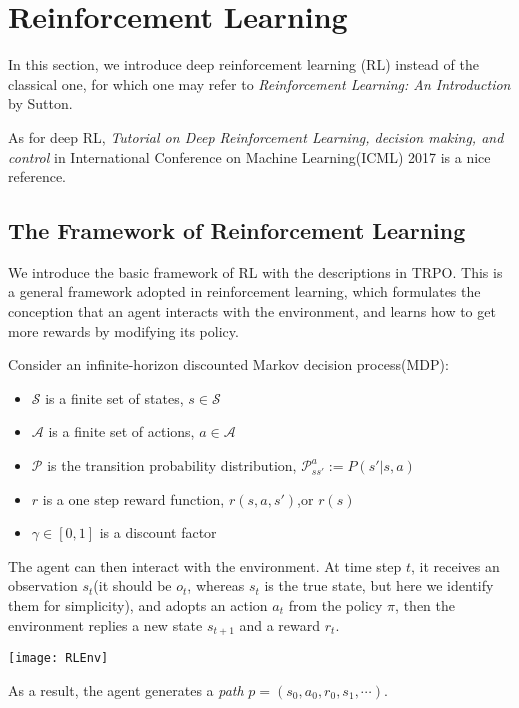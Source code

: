 \chapter{Reinforcement Learning}

In this section, we introduce deep reinforcement learning (RL) instead of the classical one, for which one may refer to \emph{Reinforcement Learning: An Introduction} by Sutton.

As for deep RL, \emph{Tutorial on Deep Reinforcement Learning, decision making, and control} in International Conference on Machine Learning(ICML) 2017 is a nice reference.

\section{The Framework of Reinforcement Learning}

We introduce the basic framework of RL with the descriptions in TRPO. This is a general framework adopted in reinforcement learning, which formulates the conception that an agent interacts with the environment, and learns how to get more rewards by modifying its policy.

Consider an infinite-horizon discounted Markov decision process(MDP): 
\begin{itemize}
    \item  $\mathcal{S}$ is a finite set of states, $s\in\mathcal{S}$
    \item $ \mathcal{A}$ is a finite set of actions, $a\in\mathcal{A}$
    \item $\mathcal{P}$ is the transition probability distribution, $\mathcal{P}_{ss'}^{a}:=P(s'|s,a)$
    \item $r$ is a one step reward function, $r(s,a,s')$,or $r(s)$ 
    \item $\gamma\in[0,1]$ is a discount factor
\end{itemize}

The agent can then interact with the environment. At time step $t$, it receives an observation $s_t$(it should be $o_t$, whereas $s_t$ is the true state, but here we identify them for simplicity), and adopts an action $a_t$ from the policy $\pi$, then the environment replies a new state $s_{t+1}$ and a reward $r_t$.

\begin{center}
\texttt{[image: RLEnv]}
\end{center}

As a result, the agent generates a \emph{path} $p=(s_0,a_0,r_0,s_1,\cdots)$.

